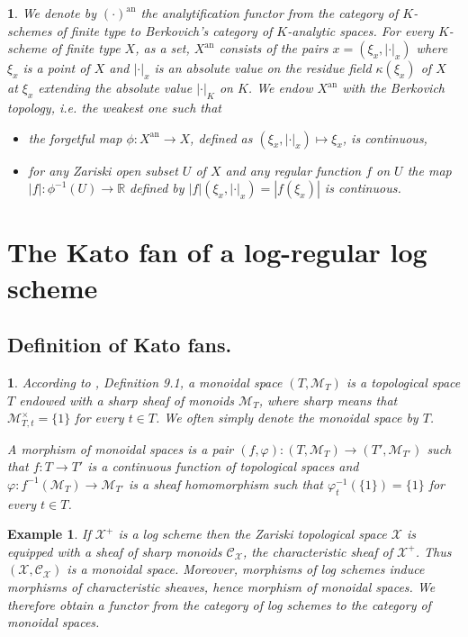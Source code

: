 \documentclass{amsart}%
\numberwithin{equation}{subsection}
\theoremstyle{plain2}
\theoremstyle{definition2}
\newtheorem{example}[equation]{Example}
\theoremstyle{stepstyle}
\theoremstyle{point}
\theoremstyle{subpoint}
\newtheorem{subpoint}[equation]{}%
\newcommand{\spa}[1]{\begin{subpoint}#1\end{subpoint}}           %
\newcommand{\R}{\ensuremath{\mathbb{R}}}
\newcommand{\cX}{\ensuremath{\mathscr{X}}}
\newcommand{\caM}{\ensuremath{\mathcal{M}}}
\newcommand{\caC}{\ensuremath{\mathcal{C}}}
\renewcommand{\R}{\ensuremath{\mathbb{R}}}
\newcommand{\an}{\mathrm{an}}
\begin{document}
\spa{We denote by $(\cdot)^{\an}$ the analytification functor from the category of $K$-schemes of finite type to Berkovich's category of $K$-analytic spaces. For every $K$-scheme of finite type $X$, as a set, $X^{\an}$ consists of the pairs $x=(\xi_x,|\cdot|_x)$ where $\xi_x$ is a point of $X$ and $|\cdot|_x$ is an absolute value on the residue field $\kappa(\xi_x)$ of $X$ at $\xi_x$ extending the absolute value $|\cdot|_K$ on $K$. We endow $X^{\an}$ with the Berkovich topology, i.e. the weakest one such that \begin{itemize}
\item[(i)] the forgetful map $\phi: X^{\an} \rightarrow X$, defined as $(\xi_x,|\cdot|_x) \mapsto \xi_x$, is continuous,
\item[(ii)] for any Zariski open subset $U$ of $X$ and any regular function $f$ on $U$ the map $|f|:\phi^{-1}(U) \rightarrow \R$ defined by $|f|(\xi_x,|\cdot|_x)=|f(\xi_x)|$ is continuous. 
\end{itemize}}

\section{The Kato fan of a log-regular log scheme} \label{sect kato fan}



\subsection{Definition of Kato fans.}
\spa{ According to \cite{Kato1994a}, Definition 9.1, a monoidal space $(T, \caM_T)$ is a topological space $T$ endowed with a sharp sheaf of monoids $\caM_T$, where \textit{sharp} means that $\caM_{T,t}^\times = \{1\}$ for every $t \in T$. We often simply denote the monoidal space by $T$.

A morphism of monoidal spaces is a pair $(f,\varphi):(T,\caM_T) \rightarrow (T',\caM_{T'})$  such that $f:T \rightarrow T'$ is a continuous function of topological spaces and $\varphi: f^{-1}(\caM_T) \rightarrow \caM_{T'}$ is a sheaf homomorphism such that $\varphi_{t}^{-1}(\{1\})=\{1\}$ for every $t \in T$.}

\begin{example}
If $\cX^+$ is a log scheme then the Zariski topological space $\cX$ is equipped with a sheaf of sharp monoids $\caC_{\cX}$, the characteristic sheaf of $\cX^+$. Thus $(\cX,\caC_{\cX})$ is a monoidal space. Moreover, morphisms of log schemes
induce morphisms of characteristic sheaves, hence morphism of monoidal spaces. We therefore obtain a functor from the category of log schemes to the category of monoidal spaces.
\end{example}
\end{document}

